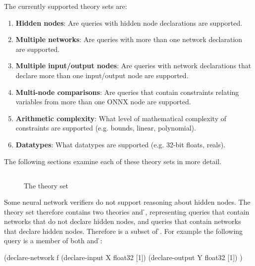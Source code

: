 The currently supported theory sets are:
\begin{enumerate}
\item \textbf{Hidden nodes}: Are queries with hidden node declarations  are supported.
\item \textbf{Multiple networks}: Are queries with more than one network declaration are supported.
\item \textbf{Multiple input/output nodes}: Are queries with network declarations that declare more than one input/output node  are supported.
\item \textbf{Multi-node comparisons}: Are queries that contain constraints relating variables from more than one ONNX node are supported.
\item \textbf{Arithmetic complexity}: What level of mathematical complexity of constraints are supported (e.g. bounds, linear, polynomial). 
\item \textbf{Datatypes}: What datatypes are supported (e.g. 32-bit floats, reals).
\end{enumerate}
The following sections examine each of these theory sets in more detail.

\subsection{\hiddenNodes{}}
\label{sec:hidden-nodes}

\begin{figure}[h]
\centering
{}
\caption{The \hiddenNodes{} theory set}
\label{fig:hidden-nodes-theory-set}
\end{figure}

Some neural network verifiers do not support reasoning about hidden nodes. The \hiddenNodes{} theory set therefore contains two theories \nh{} and \h{}, representing queries that contain networks that do not declare hidden nodes, and queries that contain networks that declare hidden nodes. Therefore \nh{} is a subset of \h{}. For example the following query is a member of both \nh{} and \h{}:

\begin{code}[style=lbnf]
(declare-network f
    (declare-input  X float32 [1])
    (declare-output Y float32 [1])
)
\end{code}

